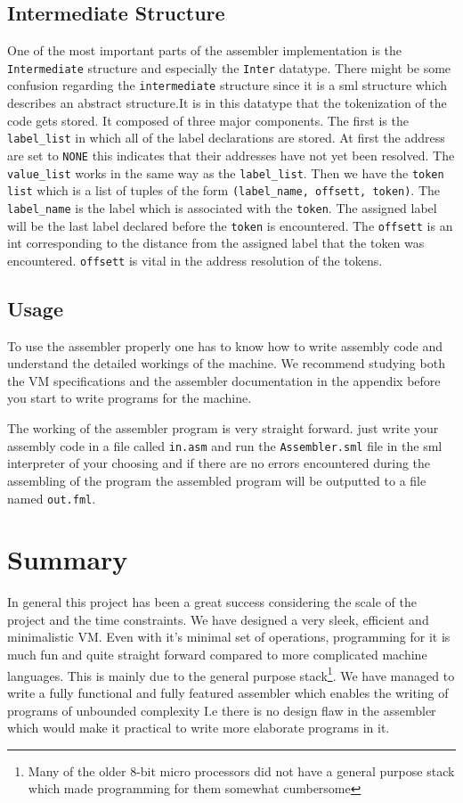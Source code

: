 \documentclass{article}
\newcommand{\V}{\verb}
\begin{document}
\subsection{Intermediate Structure}
One of the most important parts of the assembler implementation is the
\V+Intermediate+ structure and especially the \V+Inter+ datatype. There might
be some confusion regarding the \V+intermediate+ structure since it is a
sml structure which describes an abstract structure.It is in this datatype that
the tokenization of the code gets stored.
It composed of three major components. The first is the \V+label_list+ in which all of the label
declarations are stored. At first the address are set to \V+NONE+ this indicates
that their addresses have not yet been resolved. The \V+value_list+ works in the
same way as the \V+label_list+. Then we have the \V+token list+ which is a list
of tuples of the form \V+(label_name, offsett, token)+. The \V+label_name+ is
the label which is associated with the \V+token+. The assigned label will be the
last label declared before the \V+token+ is encountered. The \V+offsett+ is an
int corresponding to the distance from the assigned label that the token was
encountered. \V+offsett+ is vital in the address resolution of the tokens.



\subsection{Usage}
To use the assembler properly one has to know how to write assembly code and
understand the detailed workings of the machine. We recommend studying both the
VM specifications and the assembler documentation in the appendix before you
start to write programs for the machine.

The working of the assembler program is very straight forward. just write your
assembly code in a file called \V+in.asm+ and run the \V+Assembler.sml+ file in
the sml interpreter of your choosing and if there are no errors encountered during
the assembling of the program the assembled program will be outputted to a file
named \V+out.fml+.

\section{Summary}
In general this project has been a great success considering the scale of the
project and the time constraints. We have designed a very sleek, efficient and
minimalistic VM. Even with it's minimal set of operations, programming for it is
much fun and quite straight forward compared to more complicated machine
languages. This is mainly due to the general purpose stack\footnote{Many of the
older 8-bit micro processors did not have a general purpose stack which made
programming for them somewhat cumbersome}.
We have managed to write a fully functional and fully featured assembler which
enables the writing of programs of unbounded complexity I.e there is no design
flaw in the assembler which would make it practical to write more elaborate
programs in it.
\end{document}
